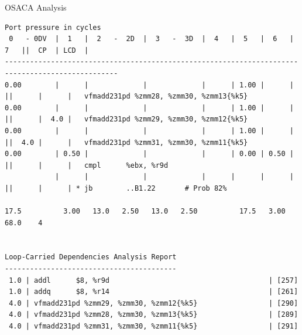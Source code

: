 \documentclass[aspectratio=169,t]{beamer}
\begin{document}
  \begin{frame}[fragile]{OSACA Analysis}
    \vspace{-20pt}
    \begin{lstlisting}[basicstyle=\tt\fontsize{4pt}{6pt}\selectfont]
                                     Port pressure in cycles
 0   - 0DV  |  1   |  2   -  2D  |  3   -  3D  |  4   |  5   |  6   |  7   ||  CP  | LCD  |
-------------------------------------------------------------------------------------------------
0.00        |      |             |             |      | 1.00 |      |      ||      |      |   vfmadd231pd %zmm28, %zmm30, %zmm13{%k5}
0.00        |      |             |             |      | 1.00 |      |      ||      |  4.0 |   vfmadd231pd %zmm29, %zmm30, %zmm12{%k5}
0.00        |      |             |             |      | 1.00 |      |      ||  4.0 |      |   vfmadd231pd %zmm31, %zmm30, %zmm11{%k5}
0.00        | 0.50 |             |             |      | 0.00 | 0.50 |      ||      |      |   cmpl      %ebx, %r9d
            |      |             |             |      |      |      |      ||      |      | * jb        ..B1.22       # Prob 82%

17.5          3.00   13.0   2.50   13.0   2.50          17.5   3.00           68.0    4


Loop-Carried Dependencies Analysis Report
-----------------------------------------
 1.0 | addl      $8, %r9d                                      | [257]
 1.0 | addq      $8, %r14                                      | [261]
 4.0 | vfmadd231pd %zmm29, %zmm30, %zmm12{%k5}                 | [290]
 4.0 | vfmadd231pd %zmm28, %zmm30, %zmm13{%k5}                 | [289]
 4.0 | vfmadd231pd %zmm31, %zmm30, %zmm11{%k5}                 | [291]
    \end{lstlisting}
  \end{frame}
\end{document}
